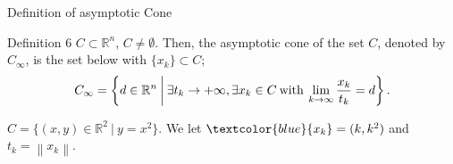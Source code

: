 \documentclass[aspectratio=169, dvipdfmx, 11pt]{beamer}
\begin{document}
\begin{frame}{Definition of asymptotic Cone}
  \begin{block}{Definition 6}
    $C \subset \mathbb{R}^n$, $C \neq \emptyset$. Then, the asymptotic cone of the set $C$, denoted by $C_\infty$, is the set below with $\{ x_k \} \subset C$;
    \begin{equation}
      C_\infty = \left\{ d \in
      \mathbb{R}^n \:\middle|\: \exists t_k \rightarrow +\infty, \exists x_k \in C \:\text{\rm with}\: \lim_{k \to \infty} \frac{x_k}{t_k} = d \right\}. \notag
    \end{equation}
  \end{block}
  \begin{example}
    $C = \{(x,y) \in \mathbb{R}^2 \:|\: y=x^2\}$. We let $\textcolor{blue}{x_k} = (k, k^2)$ and $t_k = \left\lVert x_k \right\rVert$.
  \end{example}

  \bigskip


\end{frame}
\end{document}
